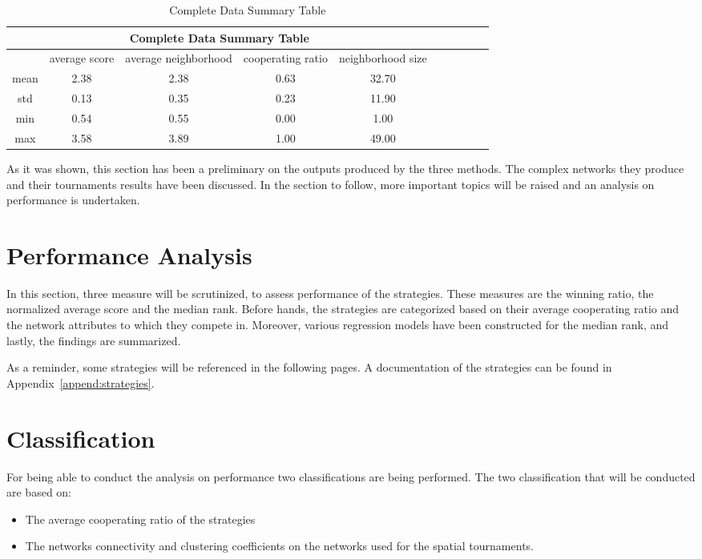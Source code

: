 \begin{table}[!hbtp]
	\centering
	\begin{adjustbox}{width=0.8\textwidth}
		\small
		\begin{tabular}{cccccccccc}
				\toprule
			\multicolumn{5}{|c|}{Complete Data Summary Table}                                      \\ \hline
			     & average score & average neighborhood & cooperating ratio & neighborhood size \\ \hline
			mean & 2.38          & 2.38                 & 0.63              & 32.70             \\ \hline
			std  & 0.13          & 0.35                 & 0.23              & 11.90             \\ \hline
			min  & 0.54          & 0.55                 & 0.00              & 1.00              \\ \hline
			max  & 3.58          & 3.89                 & 1.00              & 49.00             \\ \bottomrule
		\end{tabular}
	\end{adjustbox}
	\caption{Complete Data Summary Table}
	\label{table:summary-complete-data}
\end{table}

As it was shown, this section has been a preliminary on the outputs produced by
the three methods. The complex networks they produce and their tournaments
results have been discussed. In the section to follow, more important topics will
be raised and an analysis on performance is undertaken.

\section{Performance Analysis}
\label{performance-analysis}
In this section, three measure will be scrutinized, to assess performance of the
strategies. These measures are the winning ratio, the normalized average score
and the median rank. Before hands, the strategies are categorized based on their
average cooperating ratio and the network attributes to which they compete in. Moreover,
various regression models have been constructed for the median rank, and lastly,
the findings are summarized.

As a reminder, some strategies will be referenced in the following pages. A
documentation of the strategies can be found in Appendix~\ref{append:strategies}.

\section{Classification}
\label{sub:classification}
For being able to conduct the analysis on performance two classifications are
being performed. The two classification that will be conducted are based on:
\begin{itemize}
	\item The average cooperating ratio of the strategies
	\item The networks connectivity and clustering coefficients on the networks
	      used for the spatial tournaments.
\end{itemize}

